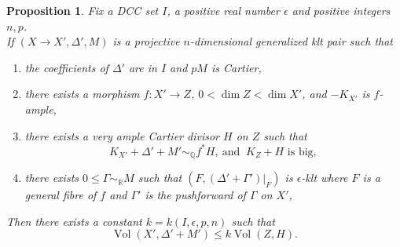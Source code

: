 \documentclass{amsart}[12pt,a4paper]
\newtheorem{proposition}[theorem]{Proposition}
\theoremstyle{definition}
\DeclareMathOperator{\Vol}{\mathrm{Vol}}
\newcommand{\rr}{\mathbb{R}}
\begin{document}
\begin{proposition}
\label{hyperplane.generalized}
Fix a DCC set $I$, a positive real number $\epsilon$ and positive integers $n, p$. 
\\
If $(X \to X', \Delta', M)$ is a projective $n$-dimensional generalized klt pair such that
	\begin{enumerate}
\item the coefficients of $\Delta'$ are in $I$ and $pM$ is Cartier,
\item there exists a morphism $f\colon X' \to Z$, $0< \dim Z < \dim X'$, and $-K_{X'}$ is $f$-ample,
\item 
there exists a very ample Cartier divisor $H$ on $Z$ such that 
\[
K_{X'}+\Delta'+M' \sim_\mathbb{Q} f^\ast H, \ \textrm{and } \ K_Z+H \textrm{ is big},
\]
\item there exists $0 \leq \Gamma \sim_\rr M$ such that $(F, (\Delta'+\Gamma')\vert_F)$ is $\epsilon$-klt where $F$ is a general fibre of $f$ and $\Gamma'$ is the pushforward of $\Gamma$ on $X'$,

\end{enumerate}		
Then there exists a constant $k=k(I, \epsilon, p, n)$ such that
\[
\Vol(X', \Delta'+M') \leq k \Vol(Z, H).
\]
\end{proposition}
\end{document}
